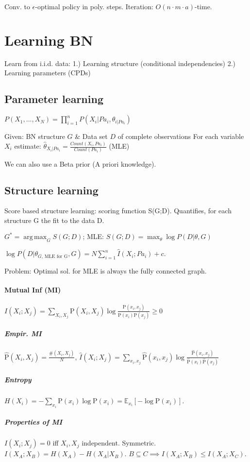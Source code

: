 \documentclass[a4paper, 10pt]{scrartcl}
\DeclareMathOperator*{\argmax}{arg\,max}
\newcommand{\uP}{\mathrm P}
\begin{document}
\begin{multicols*}{3}
Conv. to $\epsilon$-optimal policy in poly. steps. Iteration: $O(n\cdot
m\cdot a)$-time.

\section{Learning BN}
Learn from i.i.d. data: 1.) Learning structure (conditional independencies) 2.) Learning parameters (CPDs)

\subsection{Parameter learning}
$P(X_1, ..., X_N) = \prod_{i=1}^{n} P(X_i | Pa_i, {\theta}_{i | Pa_i})$

Given:  BN structure $G$ \& Data set $D$ of complete observations
For each variable $X_i$ estimate: $\hat{\theta}_{X_i | Pa_i} = \frac{Count(X_i , Pa_i)}{Count(Pa_i)}$ (MLE)

We can also use a Beta prior (A priori knowledge).

\subsection{Structure learning}
Score based structure learning: scoring function S(G;D). Quantifies, for each structure G the fit to the data D. 

$G^* = \argmax_G S(G;D)$; MLE: $S(G;D) = \max_\theta \log P(D | \theta, G)$

$\log P(D | \theta_{G \text{, MLE for G}}, G) = N \sum_{i=1}^{n} \hat{I}(X_i; Pa_i) + c$.

Problem: Optimal sol. for MLE is always the fully  connected graph. 

\paragraph{Mutual Inf (MI)}
$I(X_i; X_j) = \sum_{X_i, X_j} \uP(X_i, X_j) \log \frac{\uP(x_i, x_j)}{\uP(x_i) \uP(x_j)} \geq 0$

\subparagraph{Empir. MI}
$\hat{\uP}(X_i, X_j) = \frac{\#(X_i, X_j)}{N}$, $\hat I(X_i; X_j) = \sum_{x_i, x_j} \hat{\uP}(x_i, x_j) \log \frac{\hat{\uP}(x_i, x_j)}{\hat{\uP}(x_i) \hat{\uP}(x_j)}$

\subparagraph{Entropy}
$H(X_i) = -\sum_{x_i}\uP(x_i)\log\uP(x_i) = \mathbb{E}_{x_i}[-\log\uP(x_i)]$.

\subparagraph{Properties of MI}
$I(X_i; X_j) = 0$ iff $X_i, X_j$ independent. Symmetric.
$I(X_A; X_B) = H(X_A) - H(X_A|X_B)$.
$B \subseteq C \implies I(X_A; X_B) \leq I(X_A; X_C)$. %


\end{multicols*}
\end{document}
